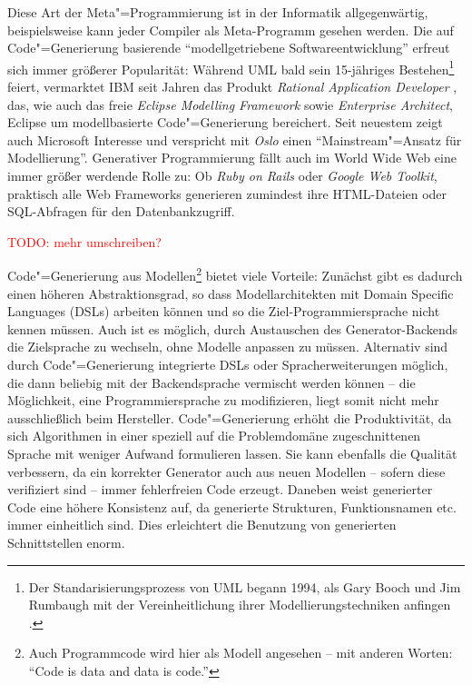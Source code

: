 \documentclass[11pt, a4paper, bibgerm]{scrbook}
\newcommand{\todo}[1]{
  \textcolor{red}{TODO: #1}
}
\newcommand{\cgen}{Code"=Generierung}
\newcommand{\mprog}{Meta"=Programmierung}
\begin{document}
Diese Art der \mprog{} ist in der Informatik allgegenwärtig,
beispielsweise kann jeder Compiler als Meta-Programm gesehen werden. Die
auf \cgen{} basierende ``modellgetriebene Softwareentwicklung'' erfreut
sich immer größerer Popularität: Während UML \cite{UML} bald sein
15-jähriges Bestehen\footnote{Der Standarisierungsprozess von UML begann
  1994, als Gary Booch und Jim Rumbaugh mit der Vereinheitlichung ihrer
  Modellierungstechniken anfingen \cite[S. 17]{UML}.} feiert, vermarktet
IBM seit Jahren das Produkt \textit{Rational Application Developer}
\cite{RAD}, das, wie auch das freie \textit{Eclipse Modelling
  Framework} sowie \textit{Enterprise Architect}, Eclipse um
modellbasierte \cgen{} bereichert. Seit neuestem zeigt auch Microsoft
Interesse und verspricht mit \textit{Oslo}  \cite{Oslo} einen
``Mainstream"=Ansatz für Modellierung''. Generativer Programmierung
fällt auch im World Wide Web eine immer größer werdende Rolle zu: Ob
\textit{Ruby on Rails} oder \textit{Google Web Toolkit}, praktisch alle
Web Frameworks generieren zumindest ihre HTML-Dateien oder SQL-Abfragen
für den Datenbankzugriff.

\todo{mehr umschreiben?}

\cgen{} aus Modellen\footnote{Auch Programmcode wird hier als Modell
  angesehen -- mit anderen Worten: "`Code is data and data is code."'}
bietet viele Vorteile: Zunächst gibt es dadurch einen höheren
Abstraktionsgrad, so dass Modellarchitekten mit Domain Specific
Languages (DSLs) arbeiten können und so die Ziel-Programmiersprache
nicht kennen müssen. Auch ist es möglich, durch Austauschen des
Generator-Backends die Zielsprache zu wechseln, ohne Modelle anpassen zu
müssen. Alternativ sind durch \cgen{} integrierte DSLs oder
Spracherweiterungen möglich, die dann beliebig mit der Backendsprache
vermischt werden können -- die Möglichkeit, eine Programmiersprache zu
modifizieren, liegt somit nicht mehr ausschließlich beim
Hersteller. \cgen{} erhöht die Produktivität, da sich Algorithmen in
einer speziell auf die Problemdomäne zugeschnittenen Sprache mit weniger
Aufwand formulieren lassen. Sie kann ebenfalls die Qualität verbessern, da ein
korrekter Generator auch aus neuen Modellen -- sofern diese verifiziert
sind -- immer fehlerfreien Code erzeugt. Daneben weist generierter Code eine
höhere Konsistenz auf, da generierte Strukturen, Funktionsnamen
etc. immer einheitlich sind. Dies erleichtert die Benutzung von
generierten Schnittstellen enorm.
\end{document}
